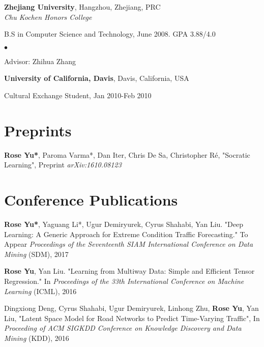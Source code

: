 \documentclass[margin,line]{res}
\newenvironment{list1}{
  \begin{list}{\ding{113}}{%
      \setlength{\itemsep}{0in}
      \setlength{\parsep}{0in} \setlength{\parskip}{0in}
      \setlength{\topsep}{0in} \setlength{\partopsep}{0in} 
      \setlength{\leftmargin}{0.17in}}}{\end{list}}
\newenvironment{list2}{
  \begin{list}{$\bullet$}{%
      \setlength{\itemsep}{0in}
      \setlength{\parsep}{0in} \setlength{\parskip}{0in}
      \setlength{\topsep}{0in} \setlength{\partopsep}{0in} 
      \setlength{\leftmargin}{0.2in}}}{\end{list}}
\begin{document}
\begin{resume}
{\bf Zhejiang University}, Hangzhou, Zhejiang, PRC\\
{\em Chu Kochen Honors College} 
\begin{list1}
\item[] B.S in Computer Science and Technology,  June 2008. GPA 3.88/4.0
\begin{list2}
\vspace*{.05in}
\item Advisor:  Zhihua Zhang
\end{list2}
\end{list1}

{\bf University of California, Davis}, Davis, California, USA\\
\vspace*{-.1in}
\begin{list1}
\item[] Cultural Exchange Student, Jan 2010-Feb 2010
\end{list1}




\section{\sc Preprints}
{\bf Rose Yu*}, Paroma Varma*, Dan Iter, Chris De Sa, Christopher R\'e,  "Socratic Learning",
Preprint \textit{ arXiv:1610.08123}

\section{\sc Conference Publications}

{\bf Rose Yu*}, Yaguang Li*, Ugur Demiryurek, Cyrus Shahabi, Yan Liu. "Deep Learning: A Generic Approach for Extreme Condition Traffic Forecasting." To Appear \textit{Proceedings  of the Seventeenth SIAM International Conference on Data Mining }(SDM),   2017

{\bf Rose Yu}, Yan Liu. "Learning from Multiway Data: Simple and Efficient Tensor Regression." In \textit{Proceedings  of the 33th International Conference on Machine Learning }(ICML),   2016

Dingxiong Deng, Cyrus Shahabi, Ugur Demiryurek, Linhong Zhu, {\bf Rose Yu}, Yan Liu, 
"Latent Space Model for Road Networks to Predict Time-Varying Traffic", In \textit{Proceeding of ACM SIGKDD Conference on Knowledge Discovery and Data Mining } (KDD), 2016



\end{resume}
\end{document}
